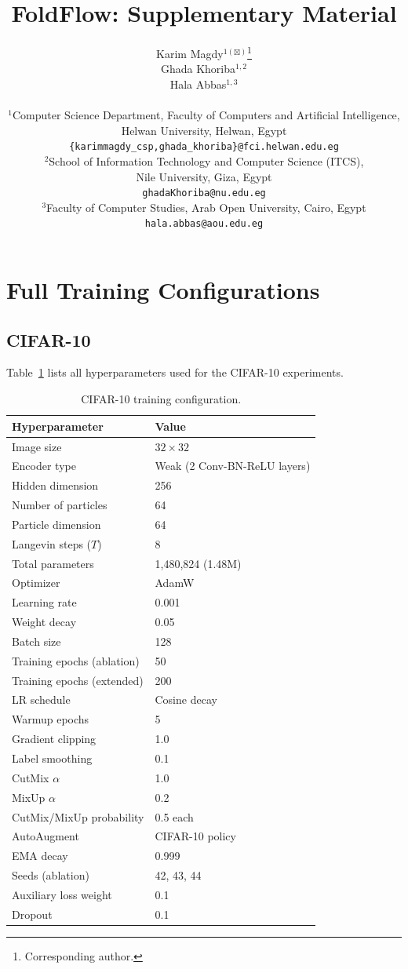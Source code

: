 \documentclass[10pt]{article}
\title{FoldFlow: Supplementary Material}
\author{
  Karim Magdy$^{1(\boxtimes)}$\thanks{Corresponding author.} \\
  \And
  Ghada Khoriba$^{1,2}$ \\
  \And
  Hala Abbas$^{1,3}$ \\
  \\
  $^1$Computer Science Department, Faculty of Computers and Artificial Intelligence, \\
  Helwan University, Helwan, Egypt \\
  \texttt{\{karimmagdy\_csp,ghada\_khoriba\}@fci.helwan.edu.eg} \\
  $^2$School of Information Technology and Computer Science (ITCS), \\
  Nile University, Giza, Egypt \\
  \texttt{ghadaKhoriba@nu.edu.eg} \\
  $^3$Faculty of Computer Studies, Arab Open University, Cairo, Egypt \\
  \texttt{hala.abbas@aou.edu.eg}
}
\begin{document}
\maketitle

\appendix

\section{Full Training Configurations}
\label{app:configs}

\subsection{CIFAR-10}

Table~\ref{tab:cifar_config} lists all hyperparameters used for the
CIFAR-10 experiments.

\begin{table}[h]
\centering
\caption{CIFAR-10 training configuration.}
\label{tab:cifar_config}
\small
\begin{tabular}{@{}ll@{}}
\toprule
Hyperparameter & Value \\
\midrule
Image size & $32 \times 32$ \\
Encoder type & Weak (2 Conv-BN-ReLU layers) \\
Hidden dimension & 256 \\
Number of particles & 64 \\
Particle dimension & 64 \\
Langevin steps ($T$) & 8 \\
Total parameters & 1,480,824 (1.48M) \\
\midrule
Optimizer & AdamW \\
Learning rate & 0.001 \\
Weight decay & 0.05 \\
Batch size & 128 \\
Training epochs (ablation) & 50 \\
Training epochs (extended) & 200 \\
LR schedule & Cosine decay \\
Warmup epochs & 5 \\
Gradient clipping & 1.0 \\
Label smoothing & 0.1 \\
\midrule
CutMix $\alpha$ & 1.0 \\
MixUp $\alpha$ & 0.2 \\
CutMix/MixUp probability & 0.5 each \\
AutoAugment & CIFAR-10 policy \\
EMA decay & 0.999 \\
\midrule
Seeds (ablation) & 42, 43, 44 \\
Auxiliary loss weight & 0.1 \\
Dropout & 0.1 \\
\bottomrule
\end{tabular}
\end{table}
\end{document}
